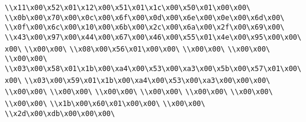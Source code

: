 \verb|\\x11\x00\x52\x01\x12\x00\x51\x01\x1c\x00\x50\x01\x00\x00\|\newline
\verb|\\x0b\x00\x70\x00\x0c\x00\x6f\x00\x0d\x00\x6e\x00\x0e\x00\x6d\x00\|\newline
\verb|\\x0f\x00\x6c\x00\x10\x00\x6b\x00\x2c\x00\x6a\x00\x2f\x00\x69\x00\|\newline
\verb|\\x43\x00\x97\x00\x44\x00\x67\x00\x46\x00\x55\x01\x4e\x00\x95\x00\x00\x00\|\newline
\verb|\\x00\x00\|\newline
\verb|\\x08\x00\x56\x01\x00\x00\|\newline
\verb|\\x00\x00\|\newline
\verb|\\x00\x00\|\newline
\verb|\\x00\x00\|\newline
\verb|\\x03\x00\x58\x01\x1b\x00\xa4\x00\x53\x00\xa3\x00\x5b\x00\x57\x01\x00\x00\|\newline
\verb|\\x03\x00\x59\x01\x1b\x00\xa4\x00\x53\x00\xa3\x00\x00\x00\|\newline
\verb|\\x00\x00\|\newline
\verb|\\x00\x00\|\newline
\verb|\\x00\x00\|\newline
\verb|\\x00\x00\|\newline
\verb|\\x00\x00\|\newline
\verb|\\x00\x00\|\newline
\verb|\\x00\x00\|\newline
\verb|\\x1b\x00\x60\x01\x00\x00\|\newline
\verb|\\x00\x00\|\newline
\verb|\\x2d\x00\xdb\x00\x00\x00\|\newline
